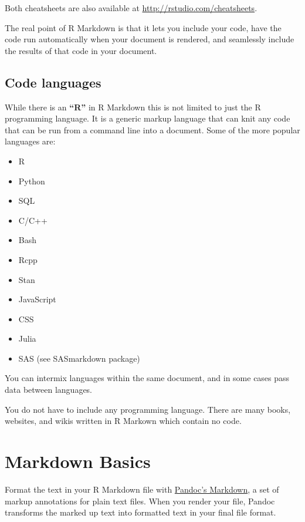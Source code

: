 \documentclass[]{book}
\providecommand{\tightlist}{%
  \setlength{\itemsep}{0pt}\setlength{\parskip}{0pt}}
\theoremstyle{definition}
\theoremstyle{definition}
\theoremstyle{definition}
\theoremstyle{remark}
\let\BeginKnitrBlock\begin \let\EndKnitrBlock\end
\begin{document}
Both cheatsheets are also available at
\url{http://rstudio.com/cheatsheets}.

The real point of R Markdown is that it lets you include your code, have
the code run automatically when your document is rendered, and
seamlessly include the results of that code in your document.

\hypertarget{code-languages}{%
\subsection{Code languages}\label{code-languages}}

While there is an \textbf{``R''} in R Markdown this is not limited to
just the R programming language. It is a generic markup language that
can knit any code that can be run from a command line into a document.
Some of the more popular languages are:

\begin{itemize}
\tightlist
\item
  R
\item
  Python
\item
  SQL
\item
  C/C++
\item
  Bash
\item
  Rcpp
\item
  Stan
\item
  JavaScript
\item
  CSS
\item
  Julia
\item
  SAS (see SASmarkdown package)
\end{itemize}

You can intermix languages within the same document, and in some cases
pass data between languages.

\BeginKnitrBlock{rmdimportant}
You do not have to include any programming language. There are many
books, websites, and wikis written in R Markown which contain no code.
\EndKnitrBlock{rmdimportant}

\hypertarget{markdown-basics}{%
\section{Markdown Basics}\label{markdown-basics}}

Format the text in your R Markdown file with
\href{https://pandoc.org/MANUAL.html\#pandocs-markdown}{Pandoc's
Markdown}, a set of markup annotations for plain text files. When you
render your file, Pandoc transforms the marked up text into formatted
text in your final file format.
\end{document}
